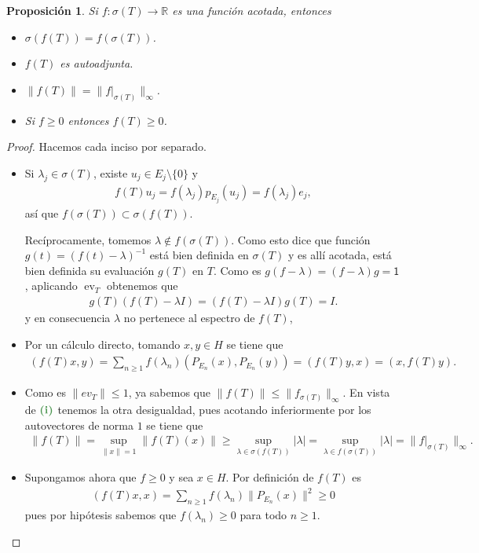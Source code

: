 \documentclass[11pt]{report}
\theoremstyle{colored}
\newtheorem{proposition}{Proposición}[section]
\newcommand{\R}{\mathbb{R}}
\newcommand{\ev}{\operatorname{ev}}
\newcommand{\ip}[1]{( #1 )}
\newcommand{\paint}[1]{\color{color}{#1}}
\newcommand{\tpaint}[1]{\paint{\textbf{#1}}}
\begin{document}
\begin{proposition} Si $f : \sigma(T) \to \R$ es una función acotada, entonces
\begin{itemize}
\item[(i)] $\sigma(f(T)) = f(\sigma(T))$.
\item[(ii)] $f(T)$ es autoadjunta.
\item[(iii)] $\|f(T)\| = \|f|_{\sigma(T)}\|_{\infty}$.
\item[(iv)] Si $f \geq 0$ entonces $f(T) \geq 0$.
\end{itemize}
\end{proposition}
\begin{proof} Hacemos cada inciso por separado. 
\begin{itemize}[listparindent = \parindent]
\item[(i)] Si $\lambda_j \in \sigma(T)$, existe $u_j \in E_j \setminus \{0\}$ y
\begin{align*}
f(T)u_j = f(\lambda_j)p_{E_j}(u_j) = f(\lambda_j)e_j,
\end{align*}
así que $f(\sigma(T)) \subset \sigma(f(T))$. 

Recíprocamente, tomemos $\lambda \not \in f(\sigma(T))$. Como esto dice que función $g(t) = (f(t)-\lambda)^{-1}$ está bien definida en $\sigma(T)$ y es allí acotada, está bien definida su evaluación $g(T)$ en $T$. Como es $g(f-\lambda) = (f-\lambda)g = \mathsf{1}$, aplicando $\ev_T$ obtenemos que
\begin{align*}
g(T)(f(T)- \lambda I) = (f(T) - \lambda I)g(T) = I.
\end{align*}
y en consecuencia $\lambda$ no pertenece al espectro de $f(T)$,
\item[(ii)] Por un cálculo directo, tomando $x,y \in H$ se tiene que 
\begin{align*}
\ip{f(T)x, y} = \sum_{n \geq 1} f(\lambda_n)\ip{P_{E_n}(x),P_{E_n}(y)}  = \ip{f(T)y,x} = \ip{x, f(T)y}.
\end{align*}
\item[(iii)] Como es $\|ev_T\| \leq 1$, ya sabemos que $\|f(T)\| \leq \|f_{\sigma(T)}\|_\infty$. En vista de $\tpaint{(i)}$ tenemos la otra desigualdad, pues acotando inferiormente por los autovectores de norma $1$ se tiene que 
\begin{align*}
\|f(T)\| = \sup_{\|x\| = 1}\|f(T)(x)\| \geq \sup_{\lambda \in \sigma(f(T))}|\lambda| = \sup_{\lambda \in f(\sigma(T))}|\lambda| = \|f|_{\sigma(T)}\|_\infty.
\end{align*}
\item[(iv)] Supongamos ahora que $f \geq 0$ y sea $x \in H$. Por definición de $f(T)$ es 
\begin{align*}
(f(T)x,x) = \sum_{n \geq 1} f(\lambda_n)\|P_{E_n}(x)\|^2 \geq 0
\end{align*}
pues por hipótesis sabemos que $f(\lambda_n) \geq 0$ para todo $n \geq 1$.
\end{itemize}
\end{proof}
\end{document}
